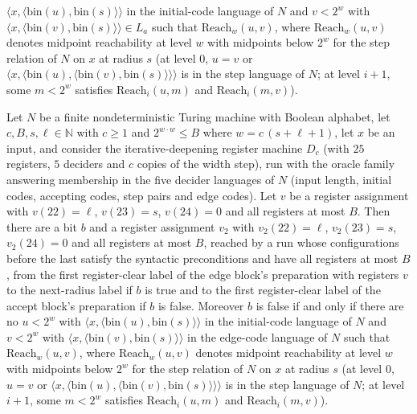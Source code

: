 \begin{theorem}
$\langle x,\langle\mathrm{bin}(u),\mathrm{bin}(s)\rangle\rangle$ in the initial-code language of $N$
and $v<2^w$ with $\langle x,\langle\mathrm{bin}(v),\mathrm{bin}(s)\rangle\rangle\in L_a$ such that
$\mathrm{Reach}_w(u,v)$, where $\mathrm{Reach}_w(u,v)$ denotes midpoint reachability at level $w$ with midpoints below $2^w$ for the step relation of $N$ on $x$ at radius $s$ (at level $0$, $u=v$ or $\langle x,\langle \mathrm{bin}(u),\langle \mathrm{bin}(v),\mathrm{bin}(s)\rangle\rangle\rangle$ is in the step language of $N$; at level $i+1$, some $m<2^w$ satisfies $\mathrm{Reach}_i(u,m)$ and $\mathrm{Reach}_i(m,v)$).
\end{theorem}

\begin{theorem}
\label{Complexity.LogProg.SavitchARM.dp_edge}
\leanok
{}
Let $N$ be a finite nondeterministic Turing machine with Boolean alphabet, let $c,B,s,\ell\in
\mathbb{N}$ with $c\ge1$ and $2^{w\cdot w}\le B$ where $w=c\,(s+\ell+1)$, let $x$ be an input,
and consider the iterative-deepening register machine $D_c$ (with $25$ registers, $5$ deciders and $c$ copies of the width step), run with the oracle family answering membership in the five decider languages of $N$ (input length, initial codes, accepting codes, step pairs and edge codes). Let $v$ be a register assignment with $v(22)=\ell$, $v(23)=s$,
$v(24)=0$ and all registers at most $B$. Then there are a bit $b$ and a register assignment $v_2$
with $v_2(22)=\ell$, $v_2(23)=s$, $v_2(24)=0$ and all registers at most $B$, reached by a run whose
configurations before the last satisfy the syntactic preconditions and have all registers at most
$B$, from the first register-clear label of the edge block's preparation with registers $v$ to the
next-radius label if $b$ is true and to the first register-clear label of the accept block's
preparation if $b$ is false. Moreover $b$ is false if and only if there are no $u<2^w$ with
$\langle x,\langle\mathrm{bin}(u),\mathrm{bin}(s)\rangle\rangle$ in the initial-code language of
$N$ and $v<2^w$ with $\langle x,\langle\mathrm{bin}(v),\mathrm{bin}(s)\rangle\rangle$ in the
edge-code language of $N$ such that $\mathrm{Reach}_w(u,v)$, where $\mathrm{Reach}_w(u,v)$ denotes midpoint reachability at level $w$ with midpoints below $2^w$ for the step relation of $N$ on $x$ at radius $s$ (at level $0$, $u=v$ or $\langle x,\langle \mathrm{bin}(u),\langle \mathrm{bin}(v),\mathrm{bin}(s)\rangle\rangle\rangle$ is in the step language of $N$; at level $i+1$, some $m<2^w$ satisfies $\mathrm{Reach}_i(u,m)$ and $\mathrm{Reach}_i(m,v)$).
\end{theorem}

